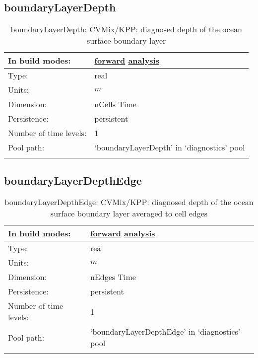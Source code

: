 \subsection[boundaryLayerDepth]{boundaryLayerDepth}
\label{subsec:var_sec_diagnostics_boundaryLayerDepth}
\begin{center}
\begin{longtable}{| p{2.0in} | p{4.0in} |}
        \hline 
        In build modes: & \hyperref[subsec:forward_var_tab_diagnostics]{forward} \hyperref[subsec:analysis_var_tab_diagnostics]{analysis} \\
        \hline 
        Type: & real \\
        \hline 
        Units: & $m$ \\
        \hline 
        Dimension: & nCells Time \\
        \hline 
        Persistence: & persistent \\
        \hline 
        Number of time levels: & 1 \\
        \hline 
            Pool path: & `boundaryLayerDepth' in `diagnostics' pool \\
		 \hline 
    \caption{boundaryLayerDepth: CVMix/KPP: diagnosed depth of the ocean surface boundary layer}
\end{longtable}
\end{center}
\subsection[boundaryLayerDepthEdge]{boundaryLayerDepthEdge}
\label{subsec:var_sec_diagnostics_boundaryLayerDepthEdge}
\begin{center}
\begin{longtable}{| p{2.0in} | p{4.0in} |}
        \hline 
        In build modes: & \hyperref[subsec:forward_var_tab_diagnostics]{forward} \hyperref[subsec:analysis_var_tab_diagnostics]{analysis} \\
        \hline 
        Type: & real \\
        \hline 
        Units: & $m$ \\
        \hline 
        Dimension: & nEdges Time \\
        \hline 
        Persistence: & persistent \\
        \hline 
        Number of time levels: & 1 \\
        \hline 
            Pool path: & `boundaryLayerDepthEdge' in `diagnostics' pool \\
		 \hline 
    \caption{boundaryLayerDepthEdge: CVMix/KPP: diagnosed depth of the ocean surface boundary layer averaged to cell edges}
\end{longtable}
\end{center}
